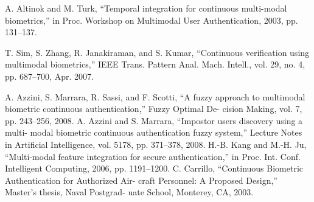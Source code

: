 \begin{thebibliography}{77}
A. Altinok and M. Turk, 
“Temporal integration for continuous multi-modal biometrics,”
in Proc. Workshop on Multimodal User Authentication, 2003, pp. 131–137.

T. Sim, S. Zhang, R. Janakiraman, and S. Kumar, 
“Continuous verification using multimodal biometrics,” 
IEEE Trans. Pattern Anal. Mach. Intell., vol. 29, no. 4, pp. 687–700, Apr. 2007.

A. Azzini, S. Marrara, R. Sassi, and F. Scotti, “A fuzzy approach to
multimodal biometric continuous authentication,” Fuzzy Optimal De-
cision Making, vol. 7, pp. 243–256, 2008.
A. Azzini and S. Marrara, “Impostor users discovery using a multi-
modal biometric continuous authentication fuzzy system,” Lecture
Notes in Artificial Intelligence, vol. 5178, pp. 371–378, 2008.
H.-B. Kang and M.-H. Ju, “Multi-modal feature integration for secure
authentication,” in Proc. Int. Conf. Intelligent Computing, 2006, pp.
1191–1200.
C. Carrillo, “Continuous Biometric Authentication for Authorized Air-
craft Personnel: A Proposed Design,” Master’s thesis, Naval Postgrad-
uate School, Monterey, CA, 2003.

\end{thebibliography}
